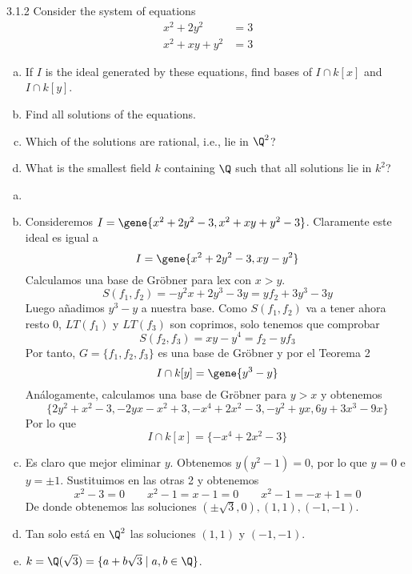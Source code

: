 \documentclass[twoside]{article}
\begin{document}
\begin{ejercicio}{3.1.2}
Consider the system of equations
\begin{align*}
x^2+2y^2&=3\\
x^2+xy+y^2&=3
\end{align*}
\begin{enumerate}[a.]
\item If $I$ is the ideal generated by these equations, find bases of $I ∩ k[x]$ and $I ∩ k[y]$.
\item Find all solutions of the equations.
\item Which of the solutions are rational, i.e., lie in $\Q^2$?
\item What is the smallest field $k$ containing $\Q$ such that all solutions lie in $k^2$?
\end{enumerate}
\end{ejercicio}
\begin{solucion}
\begin{enumerate}[a.]
\item[]
\item Consideremos $I=\gene{x^2+2y^2-3,x^2+xy+y^2-3}$. Claramente este ideal es igual a
$$
I=\gene{x^2+2y^2-3,xy-y^2}
$$
Calculamos una base de Gröbner para lex con $x>y$.
$$
S(f_1,f_2) = -y^2x + 2y^3-3y   = yf_2 + 3y^3-3y 
$$
Luego añadimos $y^3-y$ a nuestra base. Como $S(f_1,f_2)$ va a tener ahora resto 0, $LT(f_1)$ y $LT(f_3)$ son coprimos, solo tenemos que comprobar
$$
S(f_2,f_3) = xy - y^4 = f_2  -yf_3
$$
Por tanto, $G=\{f_1,f_2,f_3\}$ es una base de Gröbner y por el Teorema 2 
$$I\cap k[y] = \gene{y^3-y}$$
Análogamente, calculamos una base de Gröbner para $y>x$ y obtenemos
$$
\{2y^2 + x^2 - 3, -2yx - x^2 + 3, -x^4 + 2x^2 - 3, -y^2 + yx, 6y +3x^3 - 9x\}
$$
Por lo que 
$$
I\cap k[x] = \{-x^4+2x^2-3\}
$$
\item Es claro que mejor eliminar $y$. Obtenemos $y(y^2-1)=0$, por lo que $y=0$ e $y=\pm 1$. Sustituimos en las otras 2 y obtenemos
$$
x^2 - 3 = 0 \qquad x^2-1 = x-1 = 0 \qquad x^2 -1 = -x +1 = 0
$$
De donde obtenemos las soluciones $(\pm \sqrt{3},0),(1,1),(-1,-1)$.
\item Tan solo está en $\Q^2$ las soluciones $(1,1)$ y $(-1,-1)$.
\item $k=\Q(\sqrt{3}) = \{a+b\sqrt{3}\mid a,b\in \Q\}$.
\end{enumerate}
\end{solucion}


\newpage
\end{document}

